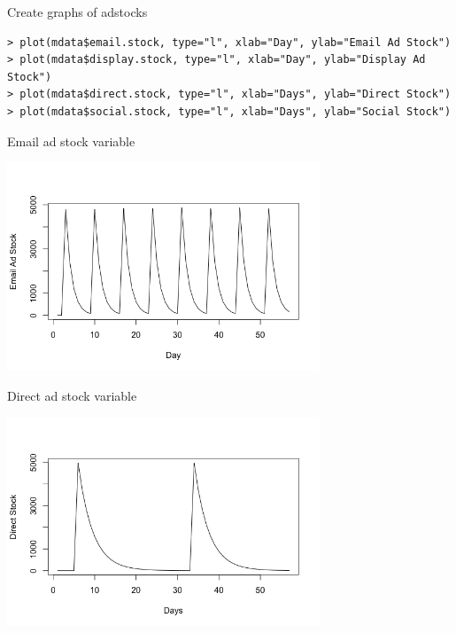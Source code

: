 \documentclass[10pt, aspectratio=169]{beamer}
\begin{document}
\begin{frame}[fragile]{Create graphs of adstocks}
\begin{lstlisting}
> plot(mdata$email.stock, type="l", xlab="Day", ylab="Email Ad Stock")
> plot(mdata$display.stock, type="l", xlab="Day", ylab="Display Ad Stock")
> plot(mdata$direct.stock, type="l", xlab="Days", ylab="Direct Stock")
> plot(mdata$social.stock, type="l", xlab="Days", ylab="Social Stock")
\end{lstlisting}
\end{frame}

\begin{frame}{Email ad stock variable}
\begin{center}
\includegraphics[width=0.7\textwidth]{images/mixmodelemailstock.png}
\end{center}
\end{frame}

\begin{frame}{Direct ad stock variable}
\begin{center}
\includegraphics[width=0.7\textwidth]{images/mixmodeldirectstock.png}
\end{center}
\end{frame}
\end{document}
